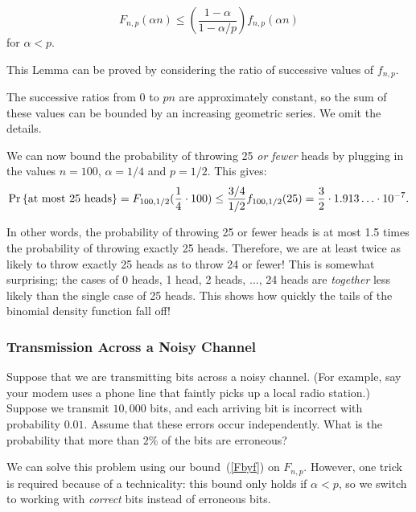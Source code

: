 \documentclass[11pt,twoside]{article}
\begin{document}
\begin{lemma*}
\begin{equation}\label{Fbyf}
F_{n, p}(\alpha n) \leq
\left(\frac{1 - \alpha}{1 - \alpha/p}\right) f_{n, p}(\alpha n)
\end{equation}
for $\alpha < p$.
\end{lemma*}

This Lemma can be proved by considering the ratio of successive values of
$f_{n, p}$.  %

The successive ratios from 0 to $pn$ are approximately
constant, so the sum of these values can be bounded by an increasing
geometric series.  We omit the details.


We can now bound the probability of throwing 25 \emph{or fewer} heads by
plugging in the values $n = 100$, $\alpha = 1/4$ and $p = 1/2$.  This
gives:
\begin{equation*}
\mathop{\textup{Pr}}\nolimits\left\{\mbox{at most 25 heads}\right\}
   = F_{100, 1/2}(\frac{1}{4} \cdot 100)
   \leq \frac{3/4}{1/2} f_{100, 1/2}(25)
   = \frac{3}{2} \cdot 1.913\ldots \cdot 10^{-7}.
\end{equation*}

In other words, the probability of throwing 25 or fewer heads is at most
1.5 times the probability of throwing exactly 25 heads.  Therefore, we are
at least twice as likely to throw exactly 25 heads as to throw 24 or
fewer!  This is somewhat surprising; the cases of 0 heads, 1 head, 2
heads, $\dots$, 24 heads are \emph{together} less likely than the single
case of 25 heads.  This shows how quickly the tails of the binomial
density function fall off!

\subsubsection{Transmission Across a Noisy Channel}\label{noisy}

Suppose that we are transmitting bits across a noisy channel.  (For
example, say your modem uses a phone line that faintly picks up a
local radio station.)  Suppose we transmit $10,000$ bits, and each
arriving bit is incorrect with probability $0.01$.  Assume that these
errors occur independently.  What is the probability that more than
$2\%$ of the bits are erroneous?

We can solve this problem using our bound~(\ref{Fbyf}) on $F_{n,p}$.
However, one trick is required because of a technicality: this bound only
holds if $\alpha < p$, so we switch to working with \emph{correct} bits
instead of erroneous bits.
\end{document}
